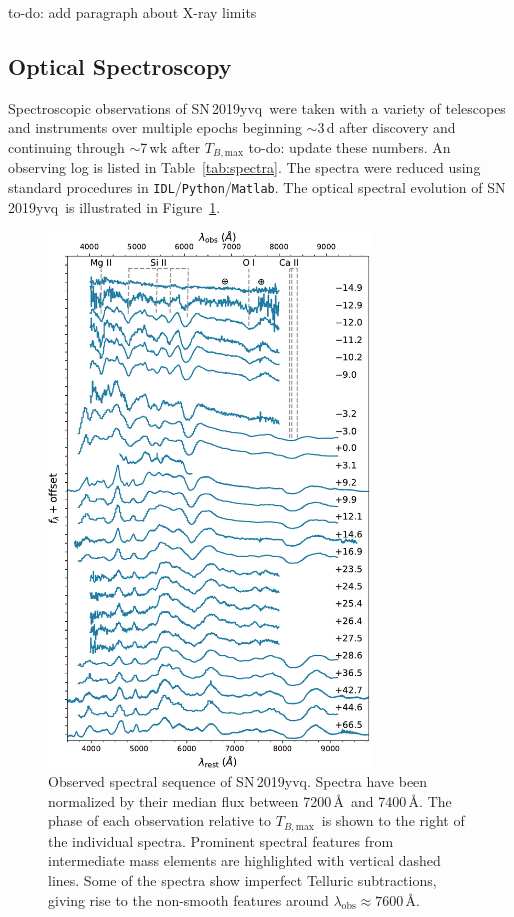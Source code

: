 \documentclass[twocolumn]{aastex63}
\newcommand{\todo}[1]{{\color{magenta} to-do: {#1}}}
\newcommand{\tbmax}{$T_{B,\mathrm{max}}$}
\newcommand{\sn}{SN\,2019yvq}
\begin{document}
\todo{add paragraph about X-ray limits}

\subsection{Optical Spectroscopy}

Spectroscopic observations of \sn\ were taken with a variety of telescopes
and instruments over multiple epochs beginning $\sim$3\,d after discovery and
continuing through $\sim$7\,wk after \tbmax \todo{update these numbers}. An
observing log is listed in Table~\ref{tab:spectra}. The spectra were reduced
using standard procedures in \texttt{IDL}/\texttt{Python}/\texttt{Matlab}.
The optical spectral evolution of \sn\ is illustrated in
Figure~\ref{fig:spec_evo}.

\begin{figure}
    \centering
    \includegraphics[width=3.35in]{./figures/spec_evo.pdf}
    \caption{Observed spectral sequence of \sn. Spectra have been normalized
    by their median flux between 7200\,\AA\ and 7400\,\AA. The phase of each
    observation relative to \tbmax\ is shown to the right of the individual
    spectra. Prominent spectral features from intermediate mass elements are
    highlighted with vertical dashed lines. Some of the spectra show
    imperfect Telluric subtractions, giving rise to the non-smooth features
    around $\lambda_\mathrm{obs} \approx 7600$\,\AA.}
    \label{fig:spec_evo}
\end{figure}
\end{document}
